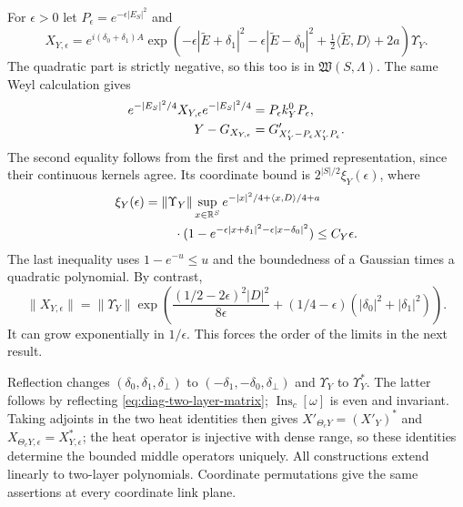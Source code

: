 For $\epsilon>0$ let $P_\epsilon=e^{-\epsilon|E_S|^2}$ and
\begin{equation}\label{eq:diag-two-layer-epsilon}
 X_{Y,\epsilon}=e^{i(\delta_0+\delta_1)A}
  \exp\left(-\epsilon|\widetilde E+\delta_1|^2
       -\epsilon|\widetilde E-\delta_0|^2
       +\tfrac12\langle\widetilde E,D\rangle+2a\right)\Upsilon_Y.
\end{equation}
The quadratic part is strictly negative, so this too is in
$\mathfrak W(S,\Lambda)$. The same Weyl calculation gives
\begin{align}\label{eq:diag-two-layer-approximation}
 e^{-|E_S|^2/4}X_{Y,\epsilon}e^{-|E_S|^2/4}
                      &=P_\epsilon k_Y^0P_\epsilon,\notag\\
 Y-G_{X_{Y,\epsilon}}&=
               G'_{X'_Y-P_\epsilon X'_YP_\epsilon}.
\end{align}
The second equality follows from the first and the primed
representation, since their continuous kernels agree. Its
coordinate bound is $2^{|S|/2}\xi_Y(\epsilon)$, where
\begin{equation}\label{eq:diag-two-layer-error}
 \begin{split}
 \xi_Y(\epsilon)={}&\|\Upsilon_Y\|
       \sup_{x\in\mathbb R^S}e^{-|x|^2/4+\langle x,D\rangle/4+a}\\
 &\quad\cdot(1-e^{-\epsilon|x+\delta_1|^2
                         -\epsilon|x-\delta_0|^2})
       \le C_Y\epsilon.
 \end{split}
\end{equation}
The last inequality uses $1-e^{-u}\le u$ and the boundedness
of a Gaussian times a quadratic polynomial. By contrast,
\begin{equation}\label{eq:diag-two-layer-operator-size}
 \|X_{Y,\epsilon}\|
 =\|\Upsilon_Y\|
   \exp\left(\frac{(1/2-2\epsilon)^2|D|^2}{8\epsilon}
                  +(1/4-\epsilon)(|\delta_0|^2+|\delta_1|^2)\right).
\end{equation}
It can grow exponentially in $1/\epsilon$. This forces the
order of the limits in the next result.

Reflection changes $(\delta_0,\delta_1,\delta_\perp)$ to
$(-\delta_1,-\delta_0,\delta_\perp)$ and
$\Upsilon_Y$ to $\Upsilon_Y^*$. The latter follows by reflecting
\eqref{eq:diag-two-layer-matrix}; $\operatorname{Ins}_c[\omega]$
is even and invariant. Taking adjoints in the two heat identities
then gives
$X'_{\Theta_cY}=(X'_Y)^*$ and
$X_{\Theta_cY,\epsilon}=X_{Y,\epsilon}^*$; the heat operator
is injective with dense range, so these identities determine
the bounded middle operators uniquely. All constructions extend
linearly to two-layer polynomials. Coordinate permutations
give the same assertions at every coordinate link plane.

